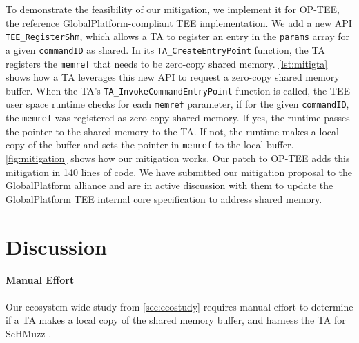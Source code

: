 \documentclass[conference]{IEEEtran} %
\newcommand{\sysname}{ScHMuzz\xspace}
\newcommand{\optee}{OP-TEE\xspace}
\providecommand{\DIFaddtex}[1]{{\protect\color{blue} \sf #1}} %
\providecommand{\DIFaddbegin}{} %
\providecommand{\DIFadd}[1]{\texorpdfstring{\DIFaddtex{#1}}{#1}} %
\begin{document}
To demonstrate the feasibility of our mitigation, we implement it for \optee, the 
reference GlobalPlatform-compliant TEE implementation. We add a new API \texttt{TEE\_RegisterShm}, 
which allows a TA to register an entry in the \texttt{params} array for a given 
\texttt{commandID} as shared. In its \texttt{TA\_CreateEntryPoint} function, the 
TA registers the \texttt{memref} that needs to be zero-copy shared memory. 
\autoref{lst:mitigta} shows how a TA leverages this new API to request a
zero-copy shared memory buffer. When the TA's \texttt{TA\_InvokeCommandEntryPoint} function is called, the TEE user 
space runtime checks for each \texttt{memref} parameter, if for the given 
\texttt{commandID}, the \texttt{memref} was registered as zero-copy shared memory. 
If yes, the runtime passes the pointer to the shared memory to the TA. 
If not, the runtime makes a local copy of the 
buffer and sets the pointer in \texttt{memref} to the local buffer.
\autoref{fig:mitigation} shows how our mitigation works.
Our patch to \optee adds this mitigation in 140 lines 
of code.
We have submitted our mitigation proposal to the GlobalPlatform alliance and are 
in active discussion with them to update the GlobalPlatform TEE internal core 
specification to address shared memory.

\begin{listing}[h]
    
    \label{lst:mitigta}
\end{listing}

\section{Discussion}\label{sec:discussion}

\DIFaddbegin \paragraph{\DIFadd{Manual Effort}}
\DIFadd{Our ecosystem-wide study from }\autoref{sec:ecostudy} \DIFadd{requires manual effort to 
determine if a TA makes a local copy of the shared memory buffer, and harness the 
TA for }\sysname\DIFadd{.
}
\end{document}
